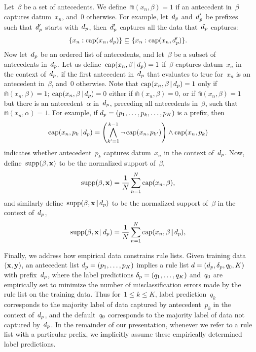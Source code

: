 Let~$\beta$ be a set of antecedents.
%
We define~${\Cap(x_n, \beta) = 1}$ if an antecedent in~$\beta$
captures datum~$x_n$, and~0 otherwise.
%
For example, let~$d_p$ and~$d_p'$ be prefixes such that~$d_p'$ starts
with~$d_p$, then~$d_p'$ captures all the data that~$d_p$ captures:
\begin{align}
\{x_n: \Cap(x_n, \Prefix)\} \subseteq \{x_n: \Cap(x_n, \Prefix')\}.
\label{eq:cap-subset}
\end{align}
%
Now let~$d_p$ be an ordered list of antecedents,
and let~$\beta$ be a subset of antecedents in~$d_p$.
%
Let us define~${\textnormal{cap}(x_n, \beta \,|\, d_p) = 1}$ if~$\beta$
captures datum~$x_n$ in the context of~$d_p$,
\ie if the first antecedent in~$d_p$ that evaluates to true for~$x_n$
is an antecedent in~$\beta$, and~0 otherwise.
%
Note that ${\textnormal{cap}(x_n, \beta \,|\, d_p) = 1}$ only if ${\Cap(x_n, \beta) = 1}$;
${\textnormal{cap}(x_n, \beta \,|\, d_p) = 0}$ either if ${\Cap(x_n, \beta) = 0}$,
or if ${\Cap(x_n, \beta) = 1}$ but there is an antecedent~$\alpha$ in~$d_p$,
preceding all antecedents in~$\beta$, such that ${\Cap(x_n, \alpha) = 1}$.
%
For example, if ${d_p = (p_1, \dots, p_k, \dots, p_K)}$ is a prefix, then
\begin{align}
\Cap(x_n, p_k \given \Prefix) =
  \left(\bigwedge_{k'=1}^{k - 1} \neg\, \Cap(x_n, p_{k'}) \right)
  \wedge \Cap(x_n, p_k)
\end{align}
indicates whether antecedent~$p_k$ captures datum~$x_n$ in the context of~$d_p$.
%
Now, define~${\textnormal{supp}(\beta, \mathbf{x})}$ to be the normalized support of~$\beta$,
\begin{align}
\Supp(\beta, \x) = \frac{1}{N} \sum_{n=1}^N \Cap(x_n, \beta),
\label{eq:support}
\end{align}
and similarly define~${\textnormal{supp}(\beta, \mathbf{x} \,|\, d_p)}$
to be the normalized support of~$\beta$ in the context of~$d_p$,
\begin{align}
\Supp(\beta, \x \given \Prefix) = \frac{1}{N} \sum_{n=1}^N \Cap(x_n, \beta \given \Prefix),
\label{eq:support-context}
\end{align}

Finally, we address how empirical data constrains rule lists.
%
Given training data~${(\mathbf{x}, \mathbf{y})}$,
an antecedent list ${d_p = (p_1, \dots, p_K)}$
implies a rule list ${{d} = (d_p, \delta_p, q_0, K)}$
with prefix~$d_p$, where the label predictions
${\delta_p = (q_1, \dots, q_K)}$ and~$q_0$ are empirically set
to minimize the number of misclassification errors made by
the rule list on the training data.
%
Thus for~${1 \le k \le K}$, label prediction~$q_k$ corresponds to the
majority label of data captured by antecedent~$p_k$ in the context of~$d_p$,
and the default~$q_0$ corresponds to the majority label of data
not captured by~$d_p$.
%
In the remainder of our presentation, whenever we refer to a rule list with a
particular prefix, we implicitly assume these empirically determined label predictions.

